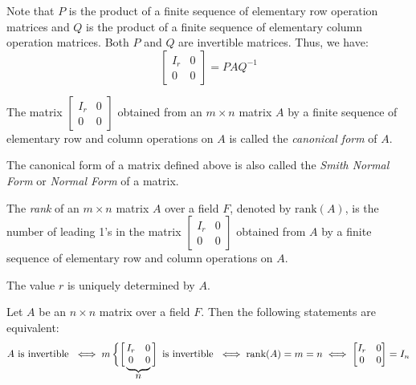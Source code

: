 \documentclass[
	11pt, %
	fleqn, %
	a4paper, %
]{LegrandOrangeBook}
\begin{document}
Note that $P$ is the product of a finite sequence of elementary row operation matrices and $Q$ is the product of a finite sequence of elementary column operation matrices. Both $P$ and $Q$ are invertible matrices. Thus, we have:
\[
    \begin{bmatrix}
        I_r & 0 \\
        0 & 0
    \end{bmatrix} = P A Q^{-1}
\]

\begin{definition}
    The matrix $\begin{bmatrix}
        I_r & 0 \\
        0 & 0
    \end{bmatrix}$ obtained from an $m \times n$ matrix $A$ by a finite sequence of elementary row and column operations on $A$ is called the \emph{canonical form} of $A$.    
\end{definition}

\begin{remark}
    The canonical form of a matrix defined above is also called the \emph{Smith Normal Form} or \emph{Normal Form} of a matrix.
\end{remark}

\begin{definition}
    The \emph{rank} of an $m \times n$ matrix $A$ over a field $F$, denoted by $\text{rank}(A)$, is the number of leading 1's in the matrix $\begin{bmatrix}
        I_r & 0 \\
        0 & 0
    \end{bmatrix}$ obtained from $A$ by a finite sequence of elementary row and column operations on $A$.
\end{definition}

\begin{remark}
    The value $r$ is uniquely determined by $A$.
\end{remark}

\def\matriximg{%
    \begin{matrix}
        I_r & 0 \\
        0 & 0 
    \end{matrix}
}

\begin{proposition}
    Let $A$ be an $n \times n$ matrix over a field $F$. Then the following statements are equivalent:
    \[
        A \text{ is invertible } \iff m \left\{\left[\vphantom{\matriximg}\right.\right.\kern-2\nulldelimiterspace
        \underbrace{\matriximg}_{\text{\normalsize $n$}}\kern-\nulldelimiterspace\left.\vphantom{\matriximg}\right] \text{ is invertible } \iff \text{rank}(A) = m = n \iff \begin{bmatrix}
            I_r & 0 \\
            0 & 0
        \end{bmatrix} = I_n
    \]
\end{proposition}
\end{document}
